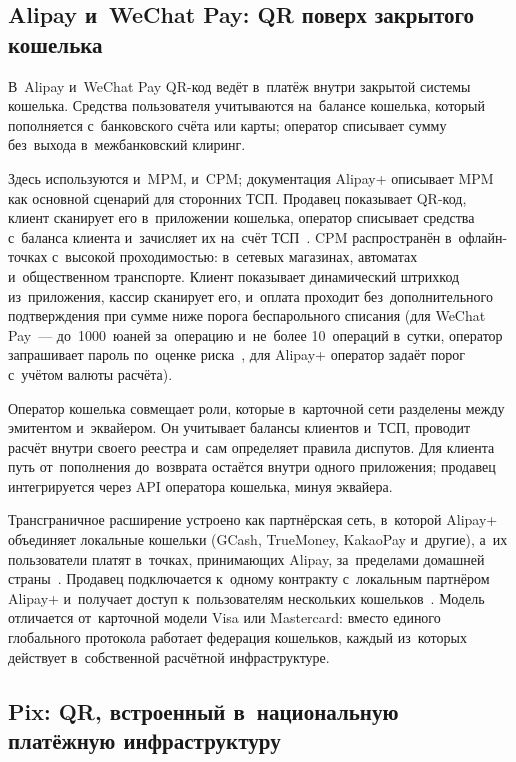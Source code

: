\subsection*{Alipay и~WeChat Pay: QR поверх закрытого
кошелька}\label{sec:qr-wallet-closed-loop}

В~Alipay и~WeChat Pay QR-код ведёт в~платёж внутри закрытой системы
кошелька. Средства пользователя учитываются на~балансе
кошелька, который пополняется с~банковского счёта или карты; оператор списывает
сумму без~выхода в~межбанковский клиринг.

Здесь используются и~MPM, и~CPM; документация Alipay+ описывает MPM как
основной сценарий для сторонних ТСП.
Продавец показывает QR-код, клиент сканирует его в~приложении кошелька,
оператор списывает средства с~баланса клиента и~зачисляет их на~счёт
ТСП~\cite{alipayplus-mpm}. CPM распространён
в~офлайн-точках с~высокой проходимостью: в~сетевых магазинах, автоматах
и~общественном транспорте. Клиент показывает динамический штрихкод
из~приложения, кассир сканирует его, и~оплата проходит без~дополнительного
подтверждения при сумме ниже порога беспарольного списания (для WeChat Pay~---
  до~1000~юаней за~операцию и~не~более 10~операций в~сутки,
  оператор запрашивает пароль по~оценке риска~\cite{wechatpay-micropay-password-rules}, для Alipay+
оператор задаёт порог с~учётом валюты расчёта).

Оператор кошелька совмещает роли, которые в~карточной сети разделены между
эмитентом и~эквайером. Он учитывает балансы клиентов и~ТСП, проводит расчёт
внутри своего реестра и~сам определяет правила диспутов. Для клиента путь
от~пополнения до~возврата остаётся внутри одного приложения; продавец
интегрируется через API оператора кошелька, минуя эквайера.

Трансграничное расширение устроено как партнёрская сеть, в~которой Alipay+
объединяет локальные кошельки (GCash, TrueMoney, KakaoPay и~другие), а~их
пользователи платят в~точках, принимающих Alipay, за~пределами домашней
страны~\cite{alipayplus-providers}.
Продавец подключается к~одному контракту с~локальным партнёром Alipay+
и~получает доступ к~пользователям нескольких кошельков~\cite{alipayplus-mpm}.
Модель отличается от~карточной модели Visa или Mastercard: вместо единого
глобального протокола работает федерация кошельков, каждый из~которых действует
в~собственной расчётной инфраструктуре.

\subsection*{Pix: QR, встроенный в~национальную платёжную
инфраструктуру}\label{sec:qr-pix}

